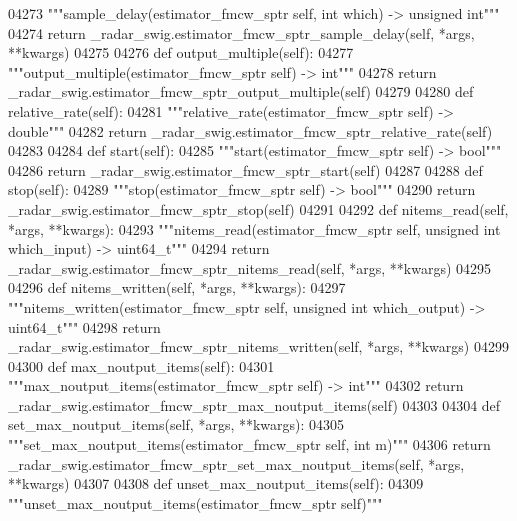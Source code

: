 \begin{DoxyCode}
{{{{{{{{{{{{{{{04273         \textcolor{stringliteral}{"""sample\_delay(estimator\_fmcw\_sptr self, int which) -> unsigned int"""}
04274         \textcolor{keywordflow}{return} \_radar\_swig.estimator\_fmcw\_sptr\_sample\_delay(self, *args, **kwargs)
04275 
04276     \textcolor{keyword}{def }output_multiple(self):
04277         \textcolor{stringliteral}{"""output\_multiple(estimator\_fmcw\_sptr self) -> int"""}
04278         \textcolor{keywordflow}{return} \_radar\_swig.estimator\_fmcw\_sptr\_output\_multiple(self)
04279 
04280     \textcolor{keyword}{def }relative_rate(self):
04281         \textcolor{stringliteral}{"""relative\_rate(estimator\_fmcw\_sptr self) -> double"""}
04282         \textcolor{keywordflow}{return} \_radar\_swig.estimator\_fmcw\_sptr\_relative\_rate(self)
04283 
04284     \textcolor{keyword}{def }start(self):
04285         \textcolor{stringliteral}{"""start(estimator\_fmcw\_sptr self) -> bool"""}
04286         \textcolor{keywordflow}{return} \_radar\_swig.estimator\_fmcw\_sptr\_start(self)
04287 
04288     \textcolor{keyword}{def }stop(self):
04289         \textcolor{stringliteral}{"""stop(estimator\_fmcw\_sptr self) -> bool"""}
04290         \textcolor{keywordflow}{return} \_radar\_swig.estimator\_fmcw\_sptr\_stop(self)
04291 
04292     \textcolor{keyword}{def }nitems_read(self, *args, **kwargs):
04293         \textcolor{stringliteral}{"""nitems\_read(estimator\_fmcw\_sptr self, unsigned int which\_input) -> uint64\_t"""}
04294         \textcolor{keywordflow}{return} \_radar\_swig.estimator\_fmcw\_sptr\_nitems\_read(self, *args, **kwargs)
04295 
04296     \textcolor{keyword}{def }nitems_written(self, *args, **kwargs):
04297         \textcolor{stringliteral}{"""nitems\_written(estimator\_fmcw\_sptr self, unsigned int which\_output) -> uint64\_t"""}
04298         \textcolor{keywordflow}{return} \_radar\_swig.estimator\_fmcw\_sptr\_nitems\_written(self, *args, **kwargs)
04299 
04300     \textcolor{keyword}{def }max_noutput_items(self):
04301         \textcolor{stringliteral}{"""max\_noutput\_items(estimator\_fmcw\_sptr self) -> int"""}
04302         \textcolor{keywordflow}{return} \_radar\_swig.estimator\_fmcw\_sptr\_max\_noutput\_items(self)
04303 
04304     \textcolor{keyword}{def }set_max_noutput_items(self, *args, **kwargs):
04305         \textcolor{stringliteral}{"""set\_max\_noutput\_items(estimator\_fmcw\_sptr self, int m)"""}
04306         \textcolor{keywordflow}{return} \_radar\_swig.estimator\_fmcw\_sptr\_set\_max\_noutput\_items(self, *args, **kwargs)
04307 
04308     \textcolor{keyword}{def }unset_max_noutput_items(self):
04309         \textcolor{stringliteral}{"""unset\_max\_noutput\_items(estimator\_fmcw\_sptr self)"""}
}}}}}}}}}}}}}}}
\end{DoxyCode}
